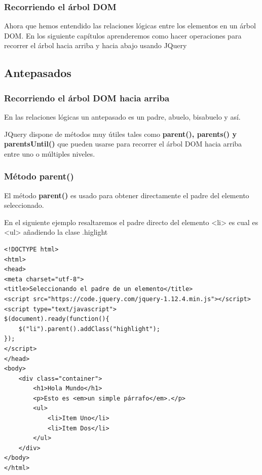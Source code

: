 \documentclass[a4paper, oneside]{article}
\begin{document}
\subsubsection{Recorriendo el árbol DOM}
\label{sec:org1a50ea9}

Ahora que hemos entendido las relaciones lógicas entre los elementos en un árbol DOM. En los siguiente capítulos aprenderemos como hacer operaciones para recorrer el árbol hacia arriba y hacia abajo usando JQuery

\subsection{Antepasados}
\label{sec:orgfcd308f}

\subsubsection{Recorriendo el árbol DOM hacia arriba}
\label{sec:org799532a}

En las relaciones lógicas un antepasado es un padre, abuelo, bisabuelo y así.

JQuery dispone de métodos muy útiles tales como \textbf{parent(), parents() y parentsUntil()} que pueden usarse para recorrer el árbol DOM hacia arriba entre uno o múltiples niveles.

\subsubsection{Método parent()}
\label{sec:orgda21fcf}

El método \textbf{parent()} es usado para obtener directamente el padre del elemento seleccionado.

En el siguiente ejemplo resaltaremos el padre directo del elemento <li> es cual es <ul> añadiendo la clase .higlight

\begin{verbatim}
<!DOCTYPE html>
<html>
<head>
<meta charset="utf-8">
<title>Seleccionando el padre de un elemento</title>
<script src="https://code.jquery.com/jquery-1.12.4.min.js"></script>
<script type="text/javascript">
$(document).ready(function(){
    $("li").parent().addClass("highlight");
});
</script>
</head>
<body>
    <div class="container">
        <h1>Hola Mundo</h1>
        <p>Esto es <em>un simple párrafo</em>.</p>
        <ul>
            <li>Item Uno</li>
            <li>Item Dos</li>
        </ul>
    </div>
</body>
</html>                                	
\end{verbatim}
\end{document}
